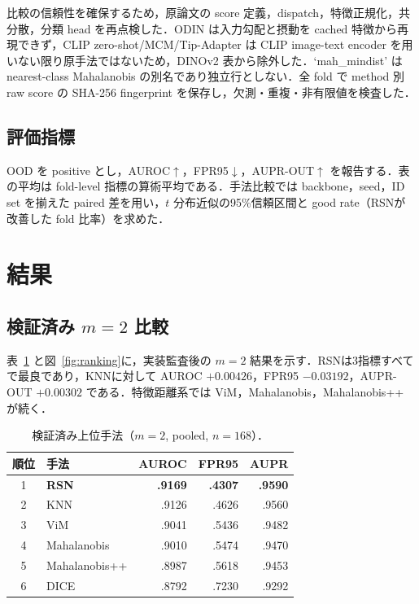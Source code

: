 \documentclass[uplatex,dvipdfmx,a4paper,10pt,twocolumn]{bxjsarticle}
\newcommand{\RSN}{RSN}
\newcommand{\knn}{KNN}
\newcommand{\good}{\mathop{\uparrow}}
\newcommand{\low}{\mathop{\downarrow}}
\begin{document}
比較の信頼性を確保するため，原論文の score 定義，dispatch，特徴正規化，共分散，分類 head を再点検した．ODIN は入力勾配と摂動を cached 特徴から再現できず，CLIP zero-shot/MCM/Tip-Adapter は CLIP image-text encoder を用いない限り原手法ではないため，DINOv2 表から除外した．`mah\_mindist' は nearest-class Mahalanobis の別名であり独立行としない．全 fold で method 別 raw score の SHA-256 fingerprint を保存し，欠測・重複・非有限値を検査した．

\subsection{評価指標}

OOD を positive とし，AUROC$\good$，FPR95$\low$，AUPR-OUT$\good$ を報告する．表の平均は fold-level 指標の算術平均である．手法比較では backbone，seed，ID set を揃えた paired 差を用い，$t$ 分布近似の95\%信頼区間と good rate（\RSN が改善した fold 比率）を求めた．

\section{結果}

\subsection{検証済み $m=2$ 比較}

表~\ref{tab:verifiedtop} と図~\ref{fig:ranking}に，実装監査後の $m=2$ 結果を示す．\RSN は3指標すべてで最良であり，\knn に対して AUROC $+0.00426$，FPR95 $-0.03192$，AUPR-OUT $+0.00302$ である．特徴距離系では ViM，Mahalanobis，Mahalanobis++ が続く．

\begin{table}[t]
\centering
\footnotesize
\caption{検証済み上位手法（$m=2$, pooled, $n=168$）．}
\label{tab:verifiedtop}
\begin{tabular}{clrrr}
\toprule
順位 & 手法 & AUROC & FPR95 & AUPR\\
\midrule
1 & \textbf{\RSN} & \textbf{.9169} & \textbf{.4307} & \textbf{.9590}\\
2 & \knn & .9126 & .4626 & .9560\\
3 & ViM & .9041 & .5436 & .9482\\
4 & Mahalanobis & .9010 & .5474 & .9470\\
5 & Mahalanobis++ & .8987 & .5618 & .9453\\
6 & DICE & .8792 & .7230 & .9292\\
\bottomrule
\end{tabular}
\end{table}
\end{document}
